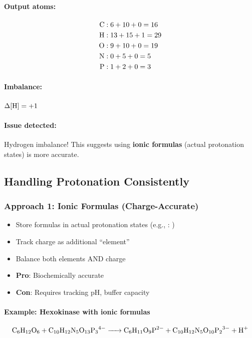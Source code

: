 \paragraph{Output atoms:}
\begin{align}
\ce{C} &: 6 + 10 + 0 = 16 \\
\ce{H} &: 13 + 15 + 1 = 29 \\
\ce{O} &: 9 + 10 + 0 = 19 \\
\ce{N} &: 0 + 5 + 0 = 5 \\
\ce{P} &: 1 + 2 + 0 = 3
\end{align}

\paragraph{Imbalance:} $\Delta[\ce{H}] = +1$

\paragraph{Issue detected:} Hydrogen imbalance! This suggests using \textbf{ionic formulas} (actual protonation states) is more accurate.

\subsection{Handling Protonation Consistently}
\label{subsec:protonation-handling}

\subsubsection{Approach 1: Ionic Formulas (Charge-Accurate)}

\begin{itemize}
    \item Store formulas in actual protonation states (e.g., : )
    \item Track charge as additional ``element''
    \item Balance both elements AND charge
    \item \textbf{Pro}: Biochemically accurate
    \item \textbf{Con}: Requires tracking pH, buffer capacity
\end{itemize}

\paragraph{Example: Hexokinase with ionic formulas}
\begin{equation}
\ce{C6H12O6 + C10H12N5O13P3^{4-} -> C6H11O9P^{2-} + C10H12N5O10P2^{3-} + H+}
\end{equation}

